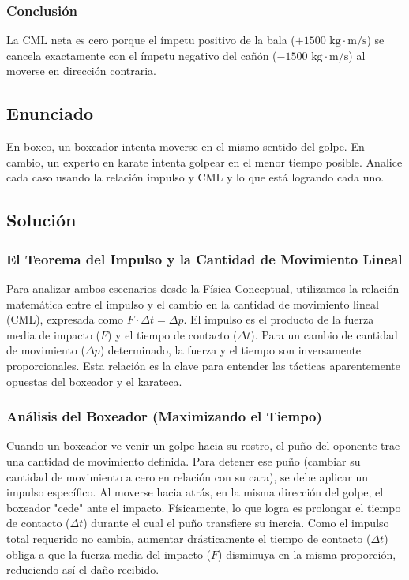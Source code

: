 \documentclass{article}
\begin{document}
\subsubsection*{Conclusión}
La CML neta es cero porque el ímpetu positivo de la bala ($+1500 \text{ kg}\cdot\text{m/s}$) se cancela exactamente con el ímpetu negativo del cañón ($-1500 \text{ kg}\cdot\text{m/s}$) al moverse en dirección contraria.

\newpage

\subsection*{Enunciado}
En boxeo, un boxeador intenta moverse en el mismo sentido del golpe. En cambio, un experto en karate intenta golpear en el menor tiempo posible. Analice cada caso usando la relación impulso y CML y lo que está logrando cada uno.

\subsection*{Solución}

\subsubsection*{El Teorema del Impulso y la Cantidad de Movimiento Lineal}
Para analizar ambos escenarios desde la Física Conceptual, utilizamos la relación matemática entre el impulso y el cambio en la cantidad de movimiento lineal (CML), expresada como $F \cdot \Delta t = \Delta p$. El impulso es el producto de la fuerza media de impacto ($F$) y el tiempo de contacto ($\Delta t$). Para un cambio de cantidad de movimiento ($\Delta p$) determinado, la fuerza y el tiempo son inversamente proporcionales. Esta relación es la clave para entender las tácticas aparentemente opuestas del boxeador y el karateca.

\subsubsection*{Análisis del Boxeador (Maximizando el Tiempo)}
Cuando un boxeador ve venir un golpe hacia su rostro, el puño del oponente trae una cantidad de movimiento definida. Para detener ese puño (cambiar su cantidad de movimiento a cero en relación con su cara), se debe aplicar un impulso específico. Al moverse hacia atrás, en la misma dirección del golpe, el boxeador "cede" ante el impacto. Físicamente, lo que logra es prolongar el tiempo de contacto ($\Delta t$) durante el cual el puño transfiere su inercia. Como el impulso total requerido no cambia, aumentar drásticamente el tiempo de contacto ($\Delta t$) obliga a que la fuerza media del impacto ($F$) disminuya en la misma proporción, reduciendo así el daño recibido.
\end{document}
